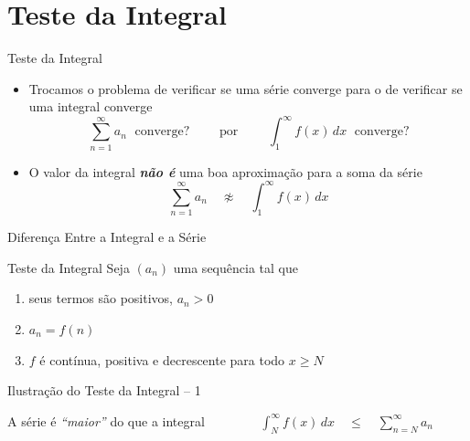 \section{Teste da Integral}

\begin{frame}{Teste da Integral}
  \begin{itemize}
    \item Trocamos o problema de verificar se uma série converge para o de
    verificar se uma integral converge
    \[ \sum_{n=1}^{\infty} a_n  \;\text{ converge?}
       \qquad \text{ por } \qquad
       \int_{1}^{\infty} f(x) \,dx  \;\text{ converge?}
    \]
    \pause
    \item O valor da integral \emph{\textbf{não é}} uma boa aproximação para a soma da série
    \[ \sum_{n=1}^{\infty} a_n  \quad \not\approx \quad \int_{1}^{\infty} f(x) \,dx\]
  \end{itemize}
\end{frame}

\begin{frame}{Diferença Entre a Integral e a Série}
  \begin{center}
    
  \end{center}
\end{frame}
\begin{frame}[t]{Teste da Integral}
  Seja $(a_n)$ uma sequência tal que
  \begin{enumerate}[<+->]
    \item seus termos são positivos, $a_n>0$
    \item $a_n=f(n)$
    \item $f$ é contínua, positiva e decrescente para todo $x \geq N$
  \end{enumerate}

\end{frame}

\begin{frame}{Ilustração do Teste da Integral -- 1}
  \begin{center}
    \scalebox{.9}{}
  \end{center}

  \pause
  A série é \emph{``maior''} do que a integral
  \pause
  \(
    \qquad\qquad
    \int_{N}^{\infty} f(x)\,dx
    \quad\leq\quad
    \sum_{n=N}^{\infty} a_n
  \)
\end{frame}

